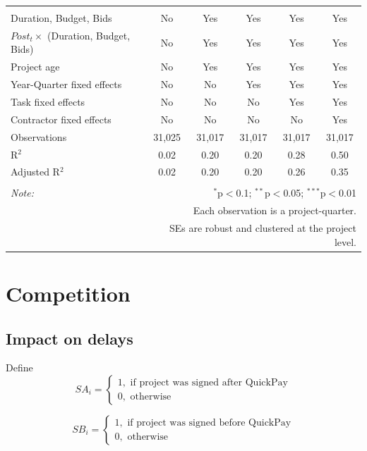 \documentclass[
]{article}
\begin{document}
\begin{table}[H]
\begin{tabular}{@{\extracolsep{-2pt}}lccccc}
\hline \\[-1.8ex] 
Duration, Budget, Bids & No & Yes & Yes & Yes & Yes \\ 
$Post_t \times $  (Duration, Budget, Bids) & No & Yes & Yes & Yes & Yes \\ 
Project age & No & Yes & Yes & Yes & Yes \\ 
Year-Quarter fixed effects & No & No & Yes & Yes & Yes \\ 
Task fixed effects & No & No & No & Yes & Yes \\ 
Contractor fixed effects & No & No & No & No & Yes \\ 
Observations & 31,025 & 31,017 & 31,017 & 31,017 & 31,017 \\ 
R$^{2}$ & 0.02 & 0.20 & 0.20 & 0.28 & 0.50 \\ 
Adjusted R$^{2}$ & 0.02 & 0.20 & 0.20 & 0.26 & 0.35 \\ 
\hline 
\hline \\[-1.8ex] 
\textit{Note:}  & \multicolumn{5}{r}{$^{*}$p$<$0.1; $^{**}$p$<$0.05; $^{***}$p$<$0.01} \\ 
 & \multicolumn{5}{r}{Each observation is a project-quarter.} \\ 
 & \multicolumn{5}{r}{SEs are robust and clustered at the project level.} \\ 
\end{tabular} 
\end{table}

\hypertarget{competition}{%
\section{Competition}\label{competition}}

\hypertarget{impact-on-delays}{%
\subsection{Impact on delays}\label{impact-on-delays}}

Define
\[ SA_i = \begin{cases} 1, \text{ if project was signed after QuickPay}\\
0, \text{ otherwise} \end{cases}\]

\[ SB_i = \begin{cases} 1, \text{ if project was signed before QuickPay}\\
0, \text{ otherwise} \end{cases}\]
\end{document}
